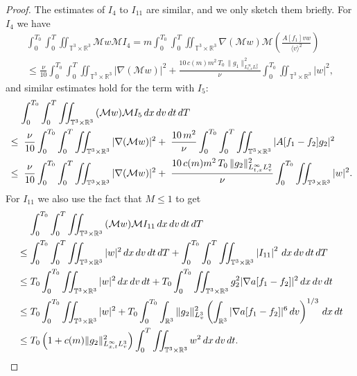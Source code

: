 \documentclass[10pt,a4paper]{amsart}
\newcommand{\CalM}{\mathcal{M}}
\newcommand{\R}{\mathbb R}
\newcommand{\T}{\mathbb{T}}
\newcommand{\dT}{\, {\rm d} T}
\newcommand{\dt}{\, {\rm d} t}
\newcommand{\dv}{\, {\rm d} v}
\newcommand{\dx}{\, {\rm d} x}
\newcommand{\vpran}[1]{\left(#1\right)}
\begin{document}
\begin{proof}
The estimates of ${I_4}$ to ${I_{11}}$ are similar, and we only sketch them briefly. For ${I_4}$ we have 
\begin{align*}
   \int_0^{T_0}\int_0^{T} \iint_{\T^3 \times \R^3}  \CalM w \CalM I_4 %
= m  \int_0^{T_0}\int_0^{T} \iint_{\T^3 \times \R^3}  \nabla (\CalM w ) \CalM\left(\frac{A[f_1]v  w }{\langle v \rangle ^2} \right) %
\\
\le  
\frac{\nu}{10}  \int_0^{T_0}\int_0^{T} \iint_{\T^3 \times \R^3}  |\nabla (\CalM w )| ^2 %
+ \frac{10 \, c(m) m^2 \, T_0 \, \|g_1\|^2_{L^\infty_{t,x}L^2_v}}{\nu}  \int_0^{T_0} \iint_{\T^3 \times \R^3}  | {w} |^2, %
\end{align*}
and similar estimates hold for the term with $I_5$:  %
\begin{align*}
& \quad \,
\int_0^{T_0}\int_0^{T} \iint_{\T^3 \times \R^3} 
 {({\CalM}w)} {\CalM} I_5 \dx\dv\dt\dT
\\ 
& \le \;  \frac{\nu}{10}  \int_0^{T_0}\int_0^{T} \iint_{\T^3 \times \R^3}  
|\nabla (\CalM w )| ^2 %
+ \; \frac{10 \, m^2}{\nu}  \int_0^{T_0}  \int_0^T \iint_{\T^3 \times \R^3} 
|A[f_1-f_2]  g_2|^2 %
\\
&\le \;  \frac{\nu}{10}  \int_0^{T_0}\int_0^{T} \iint_{\T^3 \times \R^3}  |\nabla (\CalM w )| ^2 %
+ \; \frac{10 \, c(m)m^2 \, T_0 \, \|g_2\|^2_{L^\infty_{t,x}L^2_v}}{\nu}  \int_0^{T_0} \iint_{\T^3 \times \R^3}  |w|^2. %
\end{align*}
For $I_{11}$ we also use the fact that $ {M} \le 1$ to get 
\begin{align*}
& \quad \,
\int_0^{T_0}\int_0^{T} \iint_{\T^3 \times \R^3} { ( {\CalM} w)  } \CalM {I_{11}} \dx\dv\dt\dT  
\\
&\le 
\int_0^{T_0}\int_0^{T} \iint_{\T^3 \times \R^3} |w| ^2 \dx\dv\dt\dT 
+ \int_0^{T_0}\int_0^{T} \iint_{\T^3 \times \R^3} \left| I_{11}\right|^2 \dx\dv\dt\dT
\\
&\le 
T_0 \int_0^{T_0} \iint_{\T^3 \times \R^3}  | w| ^2 \dx\dv\dt  
+  T_0 \int_0^{T_0} \iint_{\T^3 \times \R^3}  g_2^2 | \nabla a[f_1-f_2]|^2 \dx\dv\dt 
\\
&\le   
T_0 \int_0^{T_0} \iint_{\T^3 \times \R^3} |w| ^2 %
+  T_0 \int_0^{T_0} \int_{\mathbb{R}^3} \|g_2\|_{L_v^3}^2\left( \int_{\mathbb{R}^3} | \nabla a[f_1-f_2]|^6 \dv \right)^{1/3} \dx\dt
\\
&\le   
T_0 \vpran{1+ c(m) \|g_2\|^2_{L^\infty_{x,t}L_v^3}} \int_0^{T} \iint_{\T^3 \times \R^3} w^2 \dx\dv\dt.
\end{align*}

\end{proof}
\end{document}
